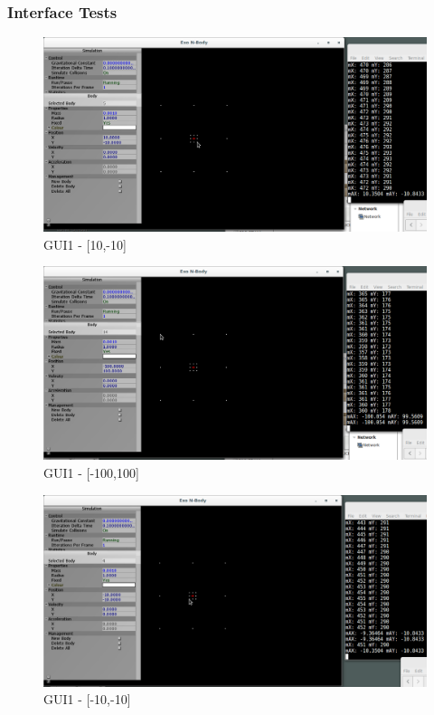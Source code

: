 \subsubsection{Interface Tests}
\begin{figure}[H]
  \centering
  \includegraphics[width=\textwidth]{img/testingEvidence/gui1_0.png}
  \caption{GUI1 - [10,-10]}
\end{figure}

\begin{figure}[H]
  \centering
  \includegraphics[width=\textwidth]{img/testingEvidence/gui1_1.png}
  \caption{GUI1 - [-100,100]}
\end{figure}

\pagebreak

\begin{figure}[H]
  \centering
  \includegraphics[width=\textwidth]{img/testingEvidence/gui1_2.png}
  \caption{GUI1 - [-10,-10]}
\end{figure}

